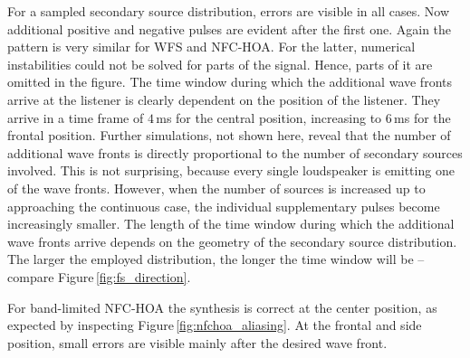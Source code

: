 For a sampled secondary source distribution, errors are visible in all cases. Now
additional positive and negative pulses are evident after the first one. Again
the pattern is very similar for \ac{WFS} and \ac{NFC-HOA}. For the latter, 
numerical instabilities could not be solved for parts of the signal.
Hence, parts of it are omitted in the figure.
The time window during which  the additional
wave fronts arrive at the listener is clearly dependent on the position of the
listener. They arrive in a time frame of $4$\,ms for the central position,
increasing to $6$\,ms for the frontal position.
Further simulations, not shown here, reveal that the number of additional wave
fronts is directly  proportional to the number of secondary sources involved.
This is not surprising, because every single loudspeaker is emitting one of the
wave fronts. However, when the number of sources is increased up to approaching
the continuous case, the individual supplementary pulses become increasingly
smaller.
The length of the time window during which the additional wave fronts
arrive depends on the geometry of the secondary source distribution. The
larger the employed distribution, the longer the time window will be -- compare
Figure\,\ref{fig:fs_direction}.

For band-limited \ac{NFC-HOA} the synthesis is correct at the center position,
as expected by inspecting Figure\,\ref{fig:nfchoa_aliasing}.
At the frontal and side position, small errors are visible mainly after the
desired wave front.

